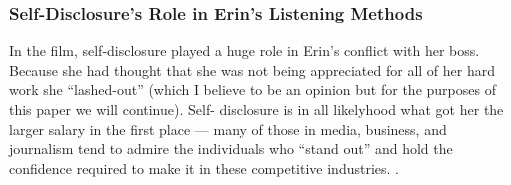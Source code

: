 \documentclass[stu,12pt]{apa7}
\begin{document}
    \subsubsection{Self-Disclosure's Role in Erin's Listening Methods}
      In the film, self-disclosure played a huge role in Erin's conflict with
        her boss. Because she had thought that she was not being appreciated
        for all of her hard work she ``lashed-out'' (which I believe to be
        an opinion but for the purposes of this paper we will continue). Self-
        disclosure is in all likelyhood what got her the larger salary in the
        first place --- many of those in media, business, and journalism tend
        to admire the individuals who ``stand out'' and hold the confidence
        required to make it in these competitive industries.
        \parencite{soderbergh_erin_2000}.


  \newpage
  \printbibliography[%
    title={References},%
    heading={bibintoc},%
    notcategory={consulted}%
  ]


  \newpage
  \nocite{*}
  \printbibliography[%
    title={Additional References},%
    heading={bibintoc},%
    category={consulted}%
  ]
\end{document}
